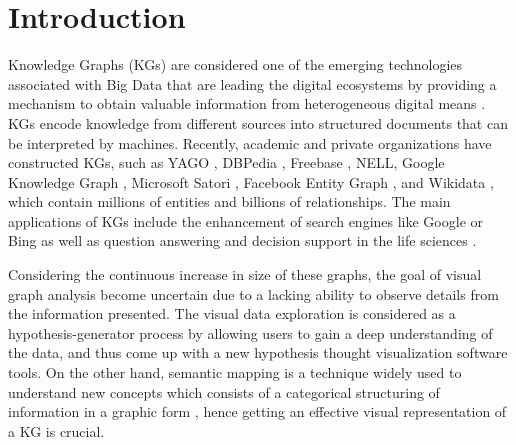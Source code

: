 \documentclass{ieeeaccess}
\begin{document}
\section{Introduction}
\label{sec:introduction}

Knowledge Graphs (KGs) are considered one of the emerging technologies 
associated with Big Data that are leading the digital ecosystems by 
providing a mechanism to obtain valuable information from heterogeneous 
digital means \cite{Panetta19}. KGs encode knowledge from different sources
into structured documents that can be interpreted by machines. Recently, 
academic and private organizations have constructed KGs, such as YAGO 
\cite{suchanek2007yago}, DBPedia \cite{auer2007dbpedia}, Freebase 
\cite{Freebase08}, NELL\cite{NELL10}, Google Knowledge Graph 
\cite{GoogleKG12}, Microsoft Satori \cite{Satori13}, Facebook Entity
Graph \cite{Facebook13}, and Wikidata \cite{Wikidata14}, which contain
millions of entities and billions of relationships. The main applications 
of KGs include the enhancement of search engines like Google \cite{GoogleKG12}
or Bing \cite{Satori13} as well as question answering and decision support
in the life sciences \cite{Belleau08,Ruttenberg09,Momtchev09}. 

Considering the continuous increase in size of these graphs, the goal of 
visual graph analysis become uncertain due to a lacking ability to observe 
details from the information presented. The visual data exploration is considered as a
hypothesis-generator process by allowing users to gain a deep understanding 
of the data, and thus come up with a new hypothesis thought visualization software
tools\cite{keim2001visual}. On the other hand, semantic mapping is a technique widely used to understand
new concepts which consists of a categorical structuring of information 
in a graphic form \cite{johnson1986semantic}, hence getting an effective visual
representation of a KG is crucial. 
\end{document}
